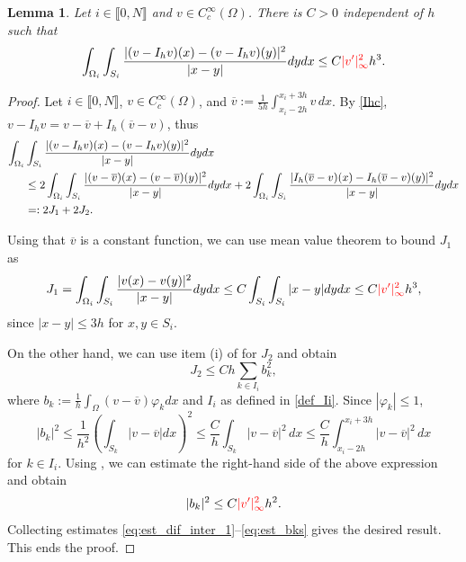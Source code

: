 \documentclass[10 pt]{article}
\newcommand\inter[1]{\llbracket #1\rrbracket}
\newtheorem{lemma}[theorem]{Lemma}
\numberwithin{equation}{section}
\newcommand{\B}[1]{{\color{red} #1}}  %
\begin{document}
\begin{lemma}\label{lem:stab_dif_interp}
Let $i\in\inter{0,N}$ and $v\in C_c^\infty(\Omega)$. There is $C>0$ independent of $h$ such that
\begin{align}\label{eq:approxim_estimate}
    \int_{\Omega_i}\int_{S_i}\frac{|(v-I_h v)(x)-(v-I_h v)(y)|^2}{|x-y|}dy dx \leq C \B{|v^\prime|^2_{\infty}} h^3. 
\end{align}
\end{lemma}
%
\begin{proof}
Let $i\in\inter{0,N}$, $v\in C_c^\infty(\Omega)$, and $\overline {v}:=\frac{1}{5h}\int_{x_i-2h}^{x_i+3h}v\,dx$.
By \eqref{Ihc}, $v-I_h v=v-\overline{v}+I_h(\overline v - v)$, thus
%
\begin{align}\notag
    \int_{\Omega_i}&\int_{S_i}\frac{|(v-I_h v)(x)-(v-I_h v)(y)|^2}{|x-y|} dy dx \\ \notag
    &\leq 2\int_{\Omega_i}\int_{S_i}\frac{|(v-\overline{v})(x)-(v-\overline{v})(y)|^2}{|x-y|}dy dx + 2 \int_{\Omega_i}\int_{S_i}\frac{|I_h(\overline v-{v})(x)-I_h(\overline v-{v})(y)|^2}{|x-y|}dy dx \\ \label{eq:est_dif_inter_1}
    &=:2J_1+2J_2.
\end{align}
%

Using that $\overline v$ is a constant function, we can use mean value theorem to bound $J_1$ as
%
\begin{equation}\label{eq:est_J1}
    J_1 = \int_{\Omega_i}\int_{S_i}\frac{|v(x)-v(y)|^2}{|x-y|}dy dx \leq C \int_{S_i}\int_{S_i}|x-y|dy dx \leq C\B{|v^\prime|^2_{\infty}}h^3,
\end{equation}
since $|x-y|\leq 3h$ for $x,y\in S_i$.

On the other hand, we can use item (i) of  for $J_2$ and obtain
%
\begin{equation}\label{eq:est_J2}
    J_2 \leq Ch\sum_{k\in I_i} b_k^2,
\end{equation}
%
where $b_k:=\frac{1}{h}\int_{\Omega}(v-\overline v)\varphi_k dx$ and $I_i$ as defined in \eqref{def_Ii}. Since $|\varphi_k|\leq 1$,
\begin{equation}\label{abk}
    |b_k|^2
    \leq \frac{1}{h^2}\left(\int_{S_k} |v-\overline v|dx\right)^2
    \leq \frac{C}{h}\int_{S_k}|v-\overline{v}|^2\, dx
    \leq \frac{C}{h}\int_{x_i-2h}^{x_i+3h}|v-\overline{v}|^2\, dx
\end{equation}
for $k\in I_i.$ Using , we can estimate the right-hand side of the above expression and obtain
%
\begin{equation}\label{eq:est_bks}
    |b_k|^2\leq C\B{|v^\prime|^2_{\infty}}h^2.
\end{equation}
%
Collecting estimates \eqref{eq:est_dif_inter_1}--\eqref{eq:est_bks} gives the desired result. This ends the proof. 
\end{proof}
\end{document}

